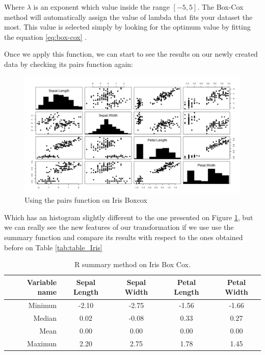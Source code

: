 \documentclass[12pt]{report}
\begin{document}
Where $\lambda$ is an exponent which value inside the range $[-5,5]$. The Box-Cox method will automatically assign the value of lambda that fits your dataset the most. This value is selected simply by looking for the optimum value by fitting the equation \ref{eq:box-cox} . \par

Once we apply this function, we can start to see the results on our newly created data by checking its pairs function again:

\begin{figure}[H]
	\centering
	\includegraphics[width=17cm]{Figuras_tfg/Figure_Boxcox}
	\caption{Using the pairs function on Iris Boxcox}
	\label{fig:figure_pairs_iris}
\end{figure}

Which has an histogram slightly different to the one presented on Figure \ref{fig:figure_pairs_iris}, but we can really see the new features of our transformation if we use use the summary function and compare its results with respect to the ones obtained before on Table \ref{tab:table_Iris}
\newline

\begin{table}[H]
		\caption{R summary method on Iris Box Cox.}
	\begin{center}
	\label{tab:table_Iris_Boxcox}
		\begin{tabular}{r|c|c|c|c} %
			\textbf{Variable name} & \textbf{Sepal Length} & \textbf{Sepal Width} & \textbf{Petal Length} & \textbf{Petal Width}\\
			\hline
			Minimun & -2.10 & -2.75 & -1.56 & -1.66\\
			Median & 0.02 & -0.08 & 0.33 & 0.27\\
			Mean & 0.00 & 0.00 & 0.00 & 0.00\\
			Maximun & 2.20 & 2.75 & 1.78 & 1.45\\
		\end{tabular}
	\end{center}
\end{table}
\end{document}
